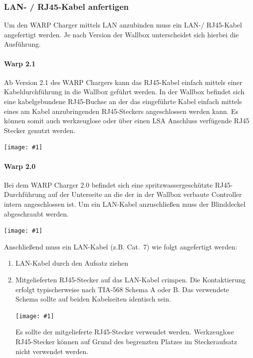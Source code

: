 \documentclass[a4paper,10pt]{article}
\newcommand{\hint}[1]{\begin{tcolorbox}[colback=boxgray,colframe=black,coltext=
white,title=Hinweis,left*=2mm,right*=2mm,boxsep=1mm,bottom=1mm,top=1mm]#1\end{tcolorbox}}
\newcommand{\gfx}[1]{\texttt{[image: \#1]}}
\begin{document}
\begin{multicols*}{2}
	\newpage
	\subsubsection{LAN- / RJ45-Kabel anfertigen}\label{ethernet}

	Um den WARP Charger mittels LAN anzubinden muss ein LAN-/ RJ45-Kabel
	angefertigt werden. Je nach Version der Wallbox unterscheidet sich hierbei
	die Ausführung.

	\paragraph{Warp 2.1}

	Ab Version 2.1 des WARP Chargers kann das RJ45-Kabel einfach mittels einer
	Kabeldurchführung in die Wallbox geführt werden. In der Wallbox befindet
	sich eine kabelgebundene RJ45-Buchse an der das eingeführte Kabel einfach
	mittels eines am Kabel anzubringenden RJ45-Steckers angeschlossen werden
	kann. Es können somit auch werkzeuglose oder über einen LSA Anschluss
	verfügende RJ45 Stecker genutzt werden.

	\gfx{./img_warp2/resized/warp2_1_top_ready_1000.jpg} %

	\paragraph{Warp 2.0}

	Bei dem WARP Charger 2.0 befindet sich eine spritzwassergeschützte
	RJ45-Durchführung auf der Unterseite an die der in der Wallbox verbaute Controller intern
	angeschlossen ist. Um ein LAN-Kabel anzuschließen muss der Blinddeckel
	abgeschraubt werden.

	\gfx{./img_warp2/resized/warp2_ethernet3_circle_600} %

	Anschließend muss ein LAN-Kabel (z.B. Cat.~7) wie folgt
	angefertigt werden:

	\columnbreak

	\begin{enumerate}
		\item LAN-Kabel durch den Aufsatz ziehen
		\item Mitgelieferten RJ45-Stecker auf das LAN-Kabel crimpen. Die
		Kontaktierung erfolgt typischerweise nach TIA-568 Schema A oder B.
		Das verwendete Schema sollte auf beiden Kabelseiten identisch sein.

		\gfx{./img_warp2/resized/warp2_rj45_1_600}
		\hint{Es sollte der mitgelieferte RJ45-Stecker verwendet werden. Werkzeuglose RJ45-Stecker können auf Grund des begrenzten
		Platzes im Steckeraufsatz nicht verwendet werden.}


\end{enumerate}
\end{multicols*}
\end{document}
